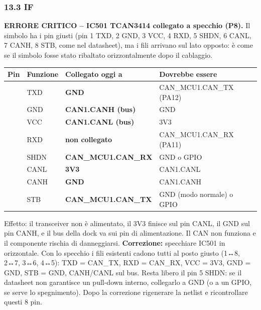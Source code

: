 \subsubsection[13.3 IF]{13.3 IF}

\begin{critbox}
\textbf{ERRORE CRITICO – IC501 TCAN3414 collegato a specchio (P8).} Il simbolo ha i pin giusti (pin 1 TXD, 2 GND, 3 VCC, 4 RXD, 5 SHDN, 6 CANL, 7 CANH, 8 STB, come nel datasheet), ma i fili arrivano sul lato opposto: è come se il simbolo fosse stato ribaltato orizzontalmente dopo il cablaggio.
\begin{center}{\footnotesize{}\setlength{\tabcolsep}{4pt}\renewcommand{\arraystretch}{1.1}
\begin{tabular}{>{\raggedright\arraybackslash}p{}>{\raggedright\arraybackslash}p{}>{\raggedright\arraybackslash}p{}>{\raggedright\arraybackslash}p{}}
\toprule
\textbf{Pin} & \textbf{Funzione} & \textbf{Collegato oggi a} & \textbf{Dovrebbe essere} \\
\midrule
1 & TXD & \textcolor{tagcrit}{\textbf{GND}} & CAN\_\allowbreak{}MCU1.CAN\_\allowbreak{}TX (PA12) \\\midrule[0.15pt]
2 & GND & \textcolor{tagcrit}{\textbf{CAN1.CANH (bus)}} & GND \\\midrule[0.15pt]
3 & VCC & \textcolor{tagcrit}{\textbf{CAN1.CANL (bus)}} & 3V3 \\\midrule[0.15pt]
4 & RXD & \textcolor{tagcrit}{\textbf{non collegato}} & CAN\_\allowbreak{}MCU1.CAN\_\allowbreak{}RX (PA11) \\\midrule[0.15pt]
5 & SHDN & \textcolor{tagcrit}{\textbf{CAN\_\allowbreak{}MCU1.CAN\_\allowbreak{}RX}} & GND o GPIO \\\midrule[0.15pt]
6 & CANL & \textcolor{tagcrit}{\textbf{3V3}} & CAN1.CANL \\\midrule[0.15pt]
7 & CANH & \textcolor{tagcrit}{\textbf{GND}} & CAN1.CANH \\\midrule[0.15pt]
8 & STB & \textcolor{tagcrit}{\textbf{CAN\_\allowbreak{}MCU1.CAN\_\allowbreak{}TX}} & GND (modo normale) o GPIO \\
\bottomrule
\end{tabular}}\end{center}
 Effetto: il transceiver non è alimentato, il 3V3 finisce sul pin CANL, il GND sul pin CANH, e il bus della dock va sui pin di alimentazione. Il CAN non funziona e il componente rischia di danneggiarsi.\newline{} \textbf{Correzione:} specchiare IC501 in orizzontale. Con lo specchio i fili esistenti cadono tutti al posto giusto (1↔8, 2↔7, 3↔6, 4↔5): TXD = CAN\_\allowbreak{}TX, RXD = CAN\_\allowbreak{}RX, VCC = 3V3, GND = GND, STB = GND, CANH/\allowbreak{}CANL sul bus. Resta libero il pin 5 SHDN: se il datasheet non garantisce un pull-down interno, collegarlo a GND (o a un GPIO, se serve lo spegnimento). Dopo la correzione rigenerare la netlist e ricontrollare questi 8 pin.
\end{critbox}

